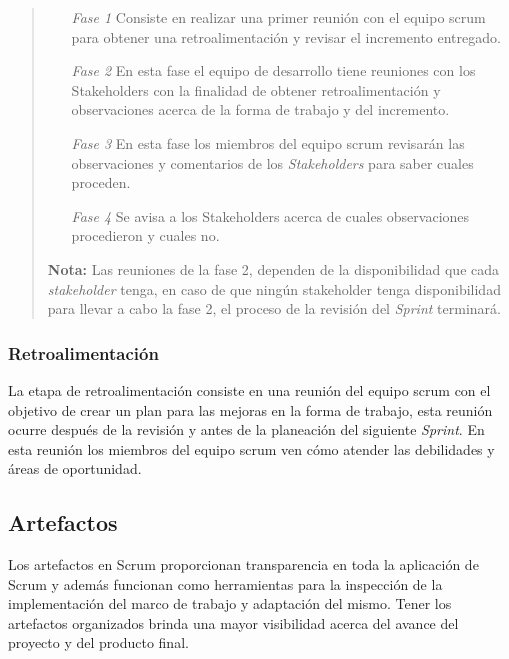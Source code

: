     \begin{quote}
    \begin{itemize}
    \item[\it Fase 1]
        Consiste en realizar una primer reunión con el equipo scrum para obtener una
        retroalimentación y revisar el incremento entregado.

    \item[\it Fase 2]
        En esta fase el equipo de desarrollo tiene reuniones con los Stakeholders con la
        finalidad de obtener retroalimentación y observaciones acerca de la forma de
        trabajo y del incremento.

    \item[\it Fase 3] 
        En esta fase los miembros del equipo scrum revisarán las observaciones y
        comentarios de los {\it Stakeholders} para saber cuales proceden.

    \item[\it Fase 4]
        Se avisa a los Stakeholders acerca de cuales observaciones procedieron y cuales no.\\
    \end{itemize}    
    
    {\bf Nota:} Las reuniones de la fase 2, dependen de la disponibilidad que cada {\it stakeholder} tenga,
                en caso de que ningún stakeholder tenga disponibilidad para llevar a cabo la fase 2,
                el proceso de la revisión del {\it Sprint} terminará.
    \end{quote}

\subsubsection{Retroalimentación}

 La etapa de retroalimentación consiste en una reunión del equipo scrum con el objetivo de crear un plan para
 las mejoras en la forma de trabajo, esta reunión ocurre después de la revisión y antes de la planeación del
 siguiente {\it Sprint}. En esta reunión los miembros del equipo scrum ven cómo atender las debilidades y áreas
 de oportunidad.

\subsection{Artefactos}

 Los artefactos en Scrum proporcionan transparencia en toda la aplicación de Scrum
 y además funcionan como herramientas para la inspección de la implementación del
 marco de trabajo y adaptación del mismo. Tener los artefactos organizados brinda
 una mayor visibilidad acerca del avance del proyecto y del producto final.
 
